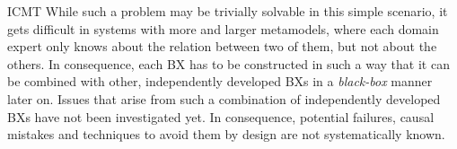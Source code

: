 \begin{copiedFrom}{ICMT}
While such a problem may be trivially solvable in this simple scenario, it gets difficult in systems with more and larger metamodels, %
where
each domain expert only knows about the relation between two of them, but not about the others.
In consequence, each \ac{BX} has to be constructed in such a way that it can be combined with other, independently developed \acp{BX} in a \emph{black-box} manner later on.
Issues that arise from such a combination of independently developed \acp{BX} %
have not been investigated yet. %
In consequence, potential failures, causal mistakes and techniques to avoid them by design are not systematically known.

\end{copiedFrom} %

